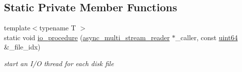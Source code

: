 \subsection*{Static Private Member Functions}
\begin{DoxyCompactItemize}
\item 
{\footnotesize template$<$typename T $>$ }\\static void \hyperlink{classasync__multi__stream__reader_a6e68c1dfe4990e3320f6b03dbf400517}{io\+\_\+procedure} (\hyperlink{classasync__multi__stream__reader}{async\+\_\+multi\+\_\+stream\+\_\+reader} $\ast$\+\_\+caller, const \hyperlink{types_8h_a60e8696a4678cd348e991a1f172e53f7}{uint64} \&\+\_\+file\+\_\+idx)
\begin{DoxyCompactList}\small\item\em start an I/O thread for each disk file \end{DoxyCompactList}\end{DoxyCompactItemize}
